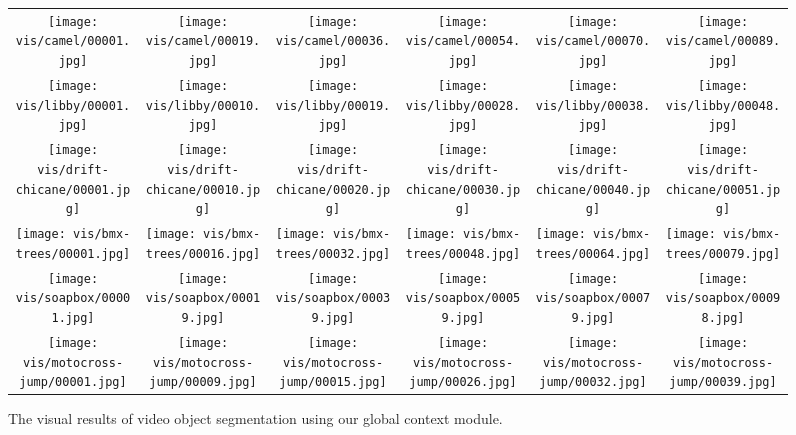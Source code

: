 \documentclass[runningheads]{llncs}
\begin{document}
\begin{figure*}[tb]
    \centering
    \setlength{\tabcolsep}{1 pt}
    \begin{tabular}{cccccc}
        \texttt{[image: vis/camel/00001.jpg]} &
        \texttt{[image: vis/camel/00019.jpg]} &
        \texttt{[image: vis/camel/00036.jpg]} &
        \texttt{[image: vis/camel/00054.jpg]} &
        \texttt{[image: vis/camel/00070.jpg]} &
        \texttt{[image: vis/camel/00089.jpg]} \\
        \texttt{[image: vis/libby/00001.jpg]} &
        \texttt{[image: vis/libby/00010.jpg]} &
        \texttt{[image: vis/libby/00019.jpg]} &
        \texttt{[image: vis/libby/00028.jpg]} &
        \texttt{[image: vis/libby/00038.jpg]} &
        \texttt{[image: vis/libby/00048.jpg]} \\
        \texttt{[image: vis/drift-chicane/00001.jpg]} &
        \texttt{[image: vis/drift-chicane/00010.jpg]} &
        \texttt{[image: vis/drift-chicane/00020.jpg]} &
        \texttt{[image: vis/drift-chicane/00030.jpg]} &
        \texttt{[image: vis/drift-chicane/00040.jpg]} &
        \texttt{[image: vis/drift-chicane/00051.jpg]} \\
        \texttt{[image: vis/bmx-trees/00001.jpg]} &
        \texttt{[image: vis/bmx-trees/00016.jpg]} &
        \texttt{[image: vis/bmx-trees/00032.jpg]} &
        \texttt{[image: vis/bmx-trees/00048.jpg]} &
        \texttt{[image: vis/bmx-trees/00064.jpg]} &
        \texttt{[image: vis/bmx-trees/00079.jpg]} \\
        \texttt{[image: vis/soapbox/00001.jpg]} &
        \texttt{[image: vis/soapbox/00019.jpg]} &
        \texttt{[image: vis/soapbox/00039.jpg]} &
        \texttt{[image: vis/soapbox/00059.jpg]} &
        \texttt{[image: vis/soapbox/00079.jpg]} &
        \texttt{[image: vis/soapbox/00098.jpg]} \\
        \texttt{[image: vis/motocross-jump/00001.jpg]} &
        \texttt{[image: vis/motocross-jump/00009.jpg]} &
        \texttt{[image: vis/motocross-jump/00015.jpg]} &
        \texttt{[image: vis/motocross-jump/00026.jpg]} &
        \texttt{[image: vis/motocross-jump/00032.jpg]} &
        \texttt{[image: vis/motocross-jump/00039.jpg]}
    \end{tabular}
    \caption{The visual results of video object segmentation using our global context module.}
    \label{fig:davis}
\end{figure*}
\end{document}
